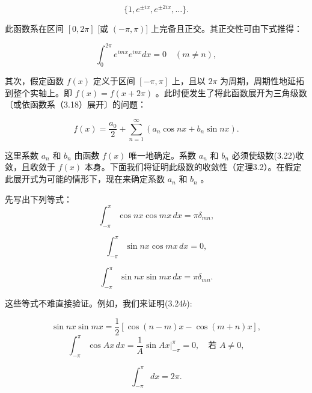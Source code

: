 \begin{equation*}
\{1, e ^ {\pm i x}, e ^ {\pm 2 i x}, \dots \}.\tag{3.20}
\end{equation*}

此函数系在区间 $[0, 2\pi]$ [或 $(- \pi, \pi)]$ 上完备且正交。其正交性可由下式推得：

\begin{equation*}
\int_ {0} ^ {2 \pi} e ^ {i m x} e ^ {i n x} d x = 0 \quad (m \neq n),\tag{3.21}
\end{equation*}

其次，假定函数 $f(x)$ 定义于区间 $[- \pi, \pi]$ 上，且以 $2\pi$ 为周期，周期性地延拓到整个实轴上。即 $f(x) = f(x + 2\pi)$ 。此时便发生了将此函数展开为三角级数〔或依函数系（3.18）展开〕的问题：

\begin{equation*}
f (x) = \frac {a _ {0}}{2} + \sum_ {n = 1} ^ {\infty} \left(a _ {n} \cos n x + b _ {n} \sin n x\right).\tag{3.22}
\end{equation*}

这里系数 $a_{n}$ 和 $b_{n}$ 由函数 $f(x)$ 唯一地确定。系数 $a_{n}$ 和 $b_{n}$ 必须使级数(3.22)收敛，且收敛于 $f(x)$ 本身。下面我们将证明此级数的收敛性（定理3.2）。在假定此展开式为可能的情形下，现在来确定系数 $a_{n}$ 和 $b_{n}$ 。

先写出下列等式：
\begin{equation*}
\int_{-\pi}^{\pi} \cos nx \cos mx \,dx = \pi \delta_{mn}, \tag{3.23}
\end{equation*}

\begin{equation*}
\int_{-\pi}^{\pi} \sin nx \cos mx \,dx = 0, \tag{3.24a}
\end{equation*}

\begin{equation*}
\int_{-\pi}^{\pi} \sin nx \sin mx \,dx = \pi \delta_{mn}. \tag{3.24b}
\end{equation*}

这些等式不难直接验证。例如，我们来证明(3.24$b$):

\begin{equation*}
\sin n x \sin m x = \frac {1}{2} [ \cos (n - m) x - \cos (m + n) x ],
\end{equation*}
\begin{equation*}
\int_{-\pi}^{\pi} \cos Ax \,dx = \frac{1}{A} \sin Ax \Bigg|_{-\pi}^{\pi} = 0, \quad \text{若 } A \neq 0, \tag{3.25}
\end{equation*}

\begin{equation*}
\int_{-\pi}^{\pi} dx = 2\pi. \tag{3.26}
\end{equation*}


